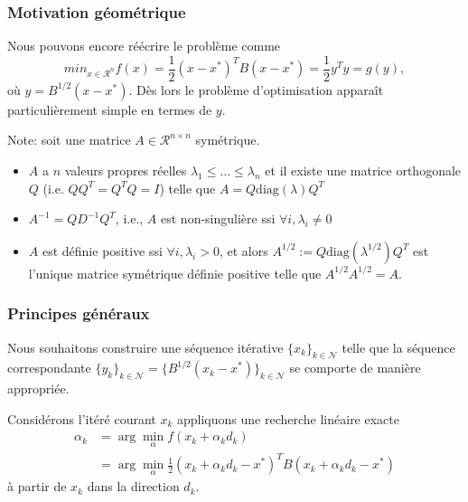 \documentclass[usepdftitle=false,aspectratio=169]{beamer}
\def\cN{\mathcal{N}}
\def\cR{\mathcal{R}}
\begin{document}
\begin{frame}
\frametitle{Motivation géométrique}

Nous pouvons encore réécrire le problème comme
$$
min_{x \in \cR^n} f(x) = \frac{1}{2}(x - x^*)^T B (x - x^*) = \frac{1}{2}y^T y = g(y),
$$
où $y = B^{1/2} (x - x^*)$.
Dès lors le problème d'optimisation apparaît particulièrement simple en termes de $y$.

\mbox{}

Note: soit une matrice $A \in \cR^{n \times n}$ symétrique.
\begin{itemize}
\item
$A$ a $n$ valeurs propres réelles $\lambda_1 \leq \ldots \leq \lambda_n$ et il existe une matrice orthogonale $Q$ (i.e. $QQ^T = Q^TQ = I$) telle que $A = Q \mbox{diag}(\lambda) Q^T$
\item
$A^{-1} = Q D^{-1} Q^T$, i.e., $A$ est non-singulière ssi $\forall i, \lambda_i \ne 0$
\item
$A$ est définie positive ssi $\forall i, \lambda_i > 0$, et alors
$
A^{1/2} := Q \mbox{diag}(\lambda^{1/2}) Q^T
$
est l'unique matrice symétrique définie positive telle que $A^{1/2}A^{1/2} = A$.
\end{itemize}

\end{frame}

\begin{frame}
\frametitle{Principes généraux}

Nous souhaitons construire une séquence itérative $\lbrace x_k \rbrace_{k \in \cN}$ telle que
la séquence correspondante $\lbrace y_k \rbrace_{k \in \cN} = \lbrace B^{1/2}(x_k - x^*) \rbrace_{k \in \cN}$ se comporte de manière appropriée.

\mbox{}

Considérons l'itéré courant $x_k$ appliquons une recherche linéaire exacte
\begin{align*}
\alpha_k &= \arg \min_{\alpha} f (x_k + \alpha_k d_k) \\
&= \arg \min_{\alpha} \frac{1}{2} (x_k + \alpha_k d_k - x^*)^T B (x_k + \alpha_k d_k - x^*)
\end{align*}
à partir de $x_k$ dans la direction $d_k$.

\end{frame}
\end{document}
